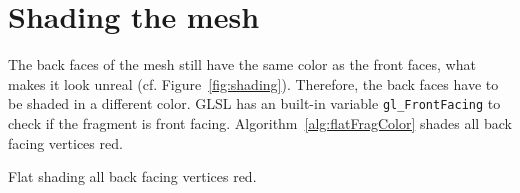 \section{Shading the mesh}
The back faces of the mesh still have the same color as the front faces, what makes it look unreal (cf. Figure~\ref{fig:shading}). Therefore, the back faces have to be shaded in a different color. GLSL has an built-in variable \texttt{gl\_FrontFacing} to check if the fragment is front facing. Algorithm~\ref{alg:flatFragColor} shades all back facing vertices red.
\begin{algorithm}
 {\;}
\BlankLine
\caption{Flat shading all back facing vertices red.}
\label{alg:flatFragColor}
\end{algorithm}

